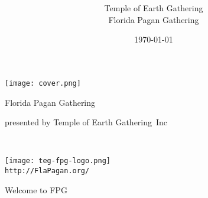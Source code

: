 \documentclass[9pt,twoside,openright,final,article]{memoir}
\date{\today}
\title{\festseason{} \festyear{}}
\author{Temple of Earth Gathering \\ Florida Pagan Gathering}
\def\TEG{{\hminfamily Temple of Earth Gathering\/\ }}
\begin{document}
\texttt{[image: cover.png]}

\begin{center} {\beltanefamily \HUGE Florida Pagan Gathering }\texttrademark{} \end{center}

\begin{center} {\beltanefamily \HUGE \festseason{} \festyear{} } \end{center}

\vfill

\vfill

\begin{center} {\footnotesize
    { \hminfamily presented by \TEG Inc}\texttrademark{} } \end{center}

\begin{multicols}{3}

  {\footnotesize \tableofcontents* }

  \columnbreak

  ~ \\
  \vfill

  \begin{center} {\texttt{[image: teg-fpg-logo.png]}} \\
    {\texttt{http://FlaPagan.org/} } \end{center}


\end{multicols}

\pagestyle{empty}
\newpage
\thispagestyle{headings}

\begin{center} {\beltanefamily \HUGE Welcome to FPG \festseason{} \festyear{}} \end{center}
\end{document}
